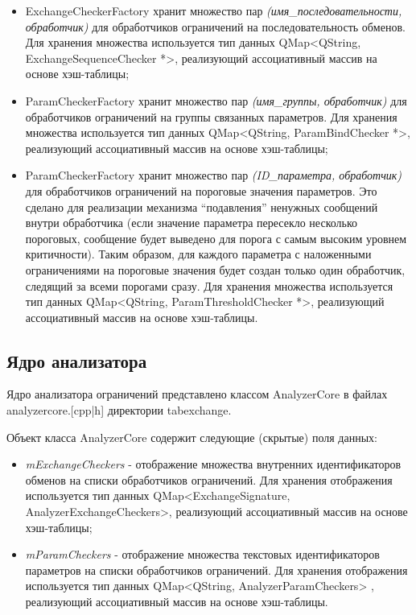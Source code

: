 \begin{itemize}
 \item ExchangeCheckerFactory хранит множество пар 
\textit{(имя\_последовательности, обработчик)} для обработчиков ограничений на 
последовательность обменов. Для хранения множества используется тип данных 
QMap<QString, ExchangeSequenceChecker *>, реализующий ассоциативный массив на 
основе хэш-таблицы;
 \item ParamCheckerFactory хранит множество пар \textit{(имя\_группы, 
обработчик)} для обработчиков ограничений на группы связанных параметров. Для 
хранения множества используется тип данных QMap<QString, ParamBindChecker *>, 
реализующий ассоциативный массив на основе хэш-таблицы;
 \item ParamCheckerFactory хранит множество пар \textit{(ID\_параметра, 
обработчик)} для обработчиков ограничений на пороговые значения параметров. Это 
сделано для реализации механизма ``подавления'' ненужных сообщений внутри 
обработчика (если значение параметра пересекло несколько пороговых, сообщение 
будет выведено для порога с самым высоким уровнем критичности). Таким образом, 
для каждого параметра с наложенными ограничениями на пороговые значения будет 
создан только один обработчик, следящий за всеми порогами сразу. Для хранения 
множества используется тип данных QMap<QString, ParamThresholdChecker *>, 
реализующий ассоциативный массив на основе хэш-таблицы.
\end{itemize}

\subsection{Ядро анализатора}

Ядро анализатора ограничений представлено классом AnalyzerCore в файлах 
analyzercore.[cpp|h] директории tabexchange.

Объект класса AnalyzerCore содержит следующие (скрытые) поля данных:

\begin{itemize}
 \item \textit{mExchangeCheckers} - отображение множества внутренних 
идентификаторов обменов на списки обработчиков ограничений. Для хранения 
отображения используется тип данных QMap<ExchangeSignature, 
AnalyzerExchangeCheckers>, реализующий ассоциативный массив на основе 
хэш-таблицы;
 \item \textit{mParamCheckers} - отображение множества текстовых 
идентификаторов параметров на списки обработчиков ограничений. Для хранения 
отображения используется тип данных QMap<QString, AnalyzerParamCheckers> , 
реализующий ассоциативный массив на основе хэш-таблицы.
\end{itemize}

